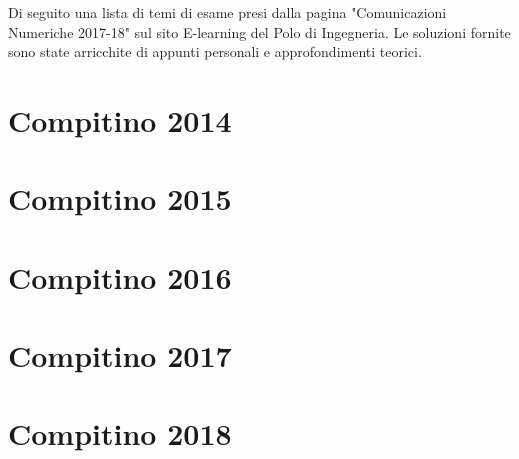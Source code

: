 \documentclass[12pt,oneside,openany]{memoir}
\numberwithin{equation}{subsection}
\begin{document}
Di seguito una lista di temi di esame presi dalla pagina "Comunicazioni
Numeriche 2017-18" sul sito E-learning del Polo di Ingegneria. Le soluzioni
fornite sono state arricchite di appunti personali e approfondimenti teorici.


\section{Compitino 2014}


\section{Compitino 2015}


\section{Compitino 2016}


\section{Compitino 2017}


\section{Compitino 2018}
\end{document}
